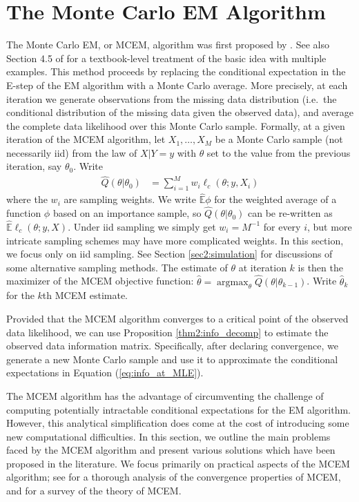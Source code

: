 \documentclass[11pt, oneside]{article}   	%
\newcommand{\bE}{\mathbb{E}}
\DeclareMathOperator*{\argmax}{argmax}
\begin{document}
\section{The Monte Carlo EM Algorithm}
\label{sec2:MCEM}

The Monte Carlo EM, or MCEM, algorithm was first proposed by \citet{Wei90}. See also Section 4.5 of \citet{Tan96} for a textbook-level treatment of the basic idea with multiple examples. This method proceeds by replacing the conditional expectation in the E-step of the EM algorithm with a Monte Carlo average. More precisely, at each iteration we generate observations from the missing data distribution (i.e.\ the conditional distribution of the missing data given the observed data), and average the complete data likelihood over this Monte Carlo sample. Formally, at a given iteration of the MCEM algorithm, let $X_1,\ldots, X_M$ be a Monte Carlo sample (not necessarily iid) from the law of $X|Y=y$ with $\theta$ set to the value from the previous iteration, say $\theta_0$. Write
%
\begin{align}
    \hat{Q}(\theta|\theta_0) &= \sum_{i=1}^M w_i \ell_c(\theta; y, X_i)
\end{align}
%
where the $w_i$ are sampling weights. We write $\hat{\bE} \phi$ \index{$\hat{\bE}$} for the weighted average of a function $\phi$ based on an importance sample, so $\hat{Q}(\theta|\theta_0)$ can be re-written as $\hat{\bE} \ell_c (\theta; y, X)$. Under iid sampling we simply get $w_i = M^{-1}$ for every $i$, but more intricate sampling schemes may have more complicated weights. In this section, we focus only on iid sampling. See Section \ref{sec2:simulation} for discussions of some alternative sampling methods. The estimate of $\theta$ at iteration $k$ is then the maximizer of the MCEM objective function: $\hat{\theta} = \argmax_\theta \hat{Q}(\theta|\theta_{k-1})$. Write $\hat{\theta}_{k}$ for the $k$th MCEM estimate. 

Provided that the MCEM algorithm converges to a critical point of the observed data likelihood, we can use Proposition \ref{thm2:info_decomp} to estimate the observed data information matrix. Specifically, after declaring convergence, we generate a new Monte Carlo sample and use it to approximate the conditional expectations in Equation (\ref{eq:info_at_MLE}).

The MCEM algorithm has the advantage of circumventing the challenge of computing potentially intractable conditional expectations for the EM algorithm. However, this analytical simplification does come at the cost of introducing some new computational difficulties. In this section, we outline the main problems faced by the MCEM algorithm and present various solutions which have been proposed in the literature. We focus primarily on practical aspects of the MCEM algorithm; see \citet{For03} for a thorough analysis of the convergence properties of MCEM, and \citet{Nea13} for a survey of the theory of MCEM.
\end{document}
